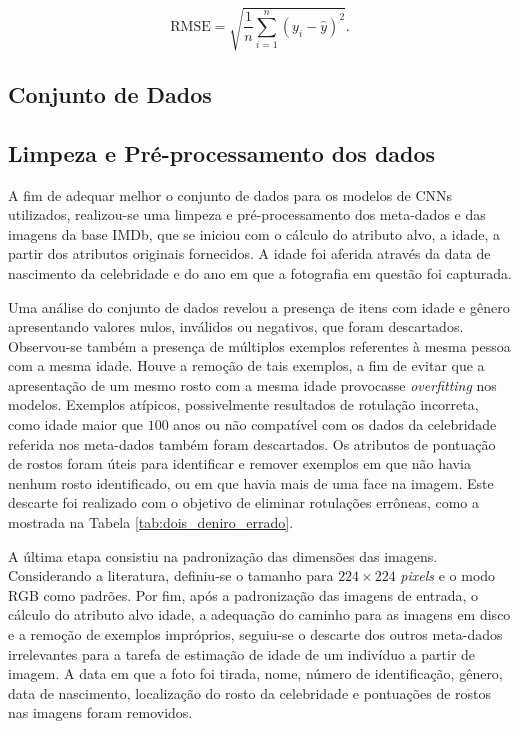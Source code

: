 \begin{equation}\label{eq:rmse}
     \textrm{RMSE} = \sqrt{\frac{1}{n} \sum_{i=1}^n (y_i - \hat{y})^2}.
\end{equation}

\subsection{Conjunto de Dados}\label{subsec:dataset}


\subsection{Limpeza e Pré-processamento dos dados}\label{subsec:limpeza}

A fim de adequar melhor o conjunto de dados para os modelos de CNNs utilizados, realizou-se uma limpeza e pré-processamento dos meta-dados e das imagens da base IMDb, que se iniciou com o cálculo do atributo alvo, a idade, a partir dos atributos originais fornecidos. A idade foi aferida através da data de nascimento da celebridade e do ano em que a fotografia em questão foi capturada.

Uma análise do conjunto de dados revelou a presença de itens com idade e gênero apresentando valores nulos, inválidos ou negativos, que foram descartados. Observou-se também a presença de múltiplos exemplos referentes à mesma pessoa com a mesma idade. Houve a remoção de tais exemplos, a fim de evitar que a apresentação de um mesmo rosto com a mesma idade provocasse \emph{overfitting} nos modelos. Exemplos atípicos, possivelmente resultados de rotulação incorreta, como idade maior que $100$ anos ou não compatível com os dados da celebridade referida nos meta-dados também foram descartados. Os atributos de pontuação de rostos foram úteis para identificar e remover exemplos em que não havia nenhum rosto identificado, ou em que havia mais de uma face na imagem. Este descarte foi realizado com o objetivo de eliminar rotulações errôneas, como a mostrada na Tabela \ref{tab:dois_deniro_errado}.

A última etapa consistiu na padronização das dimensões das imagens. Considerando a literatura, definiu-se o tamanho para $224 \times 224$ \emph{pixels} e o modo RGB como padrões. Por fim, após a padronização das imagens de entrada, o cálculo do atributo alvo idade, a adequação do caminho para as imagens em disco e a remoção de exemplos impróprios, seguiu-se o descarte dos outros meta-dados irrelevantes para a tarefa de estimação de idade de um indivíduo a partir de imagem. A data em que a foto foi tirada, nome, número de identificação, gênero, data de nascimento, localização do rosto da celebridade e pontuações de rostos nas imagens foram removidos.

